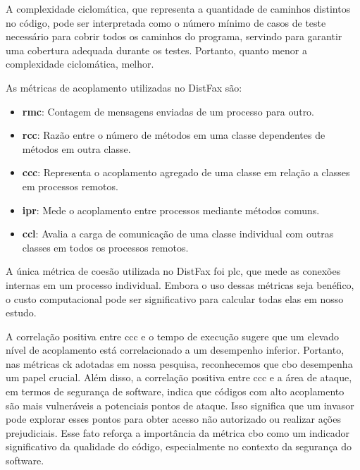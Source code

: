 A complexidade ciclomática, que representa a quantidade de caminhos distintos no código, pode ser interpretada como o número mínimo de casos de teste necessário para cobrir todos os caminhos do programa, servindo para garantir uma cobertura adequada durante os testes. Portanto, quanto menor a complexidade ciclomática, melhor.

As métricas de acoplamento utilizadas no DistFax são:
\begin{itemize}
    \item \textbf{\gls{rmc}}: Contagem de mensagens enviadas de um processo para outro.
    \item \textbf{\gls{rcc}}: Razão entre o número de métodos em uma classe dependentes de métodos em outra classe.
    \item \textbf{\gls{ccc}}: Representa o acoplamento agregado de uma classe em relação a classes em processos remotos.
    \item \textbf{\gls{ipr}}: Mede o acoplamento entre processos mediante métodos comuns.
    \item \textbf{\gls{ccl}}: Avalia a carga de comunicação de uma classe individual com outras classes em todos os processos remotos.
\end{itemize}

A única métrica de coesão utilizada no DistFax foi \gls{plc}, que mede as conexões internas em um processo individual. Embora o uso dessas métricas seja benéfico, o custo computacional pode ser significativo para calcular todas elas em nosso estudo.

A correlação positiva entre \gls{ccc} e o tempo de execução sugere que um elevado nível de acoplamento está correlacionado a um desempenho inferior. Portanto, nas métricas \gls{ck} adotadas em nossa pesquisa, reconhecemos que \gls{cbo} desempenha um papel crucial. Além disso, a correlação positiva entre \gls{ccc} e a área de ataque, em termos de segurança de software, indica que códigos com alto acoplamento são mais vulneráveis a potenciais pontos de ataque. Isso significa que um invasor pode explorar esses pontos para obter acesso não autorizado ou realizar ações prejudiciais. Esse fato reforça a importância da métrica \gls{cbo} como um indicador significativo da qualidade do código, especialmente no contexto da segurança do software.